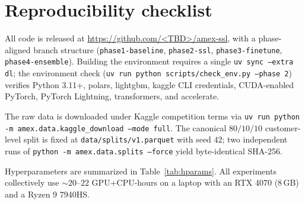 \documentclass[sigconf, anonymous, review]{acmart}
\begin{document}



\appendix

\section{Reproducibility checklist}
\label{app:repro}

All code is released at \url{https://github.com/<TBD>/amex-ssl}, with
a phase-aligned branch structure (\texttt{phase1-baseline},
\texttt{phase2-ssl}, \texttt{phase3-finetune},
\texttt{phase4-ensemble}). Building the environment requires a single
\texttt{uv sync --extra dl}; the environment check
(\texttt{uv run python scripts/check\_env.py --phase 2}) verifies
Python 3.11+, polars, lightgbm, kaggle CLI credentials, CUDA-enabled
PyTorch, PyTorch Lightning, transformers, and accelerate.

The raw data is downloaded under Kaggle competition terms via
\texttt{uv run python -m amex.data.kaggle\_download --mode full}. The
canonical $80/10/10$ customer-level split is fixed at
\texttt{data/splits/v1.parquet} with seed $42$; two independent runs
of \texttt{python -m amex.data.splits --force} yield byte-identical
SHA-256.

Hyperparameters are summarized in Table~\ref{tab:hparams}. All
experiments collectively use $\sim 20$--$22$ GPU+CPU-hours on a
laptop with an RTX 4070 (8\,GB) and a Ryzen 9 7940HS.
\end{document}
